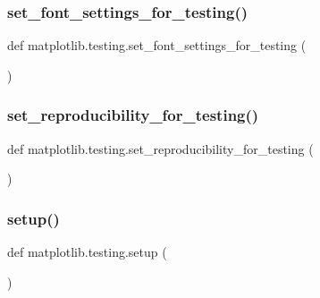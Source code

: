 \subsubsection{\texorpdfstring{set\+\_\+font\+\_\+settings\+\_\+for\+\_\+testing()}{set\_font\_settings\_for\_testing()}}
{\footnotesize\ttfamily def matplotlib.\+testing.\+set\+\_\+font\+\_\+settings\+\_\+for\+\_\+testing (\begin{DoxyParamCaption}{ }\end{DoxyParamCaption})}

\mbox{\label{namespacematplotlib_1_1testing_a52faea5be4a2f14a557b8adb5b7f3294}} 
\subsubsection{\texorpdfstring{set\+\_\+reproducibility\+\_\+for\+\_\+testing()}{set\_reproducibility\_for\_testing()}}
{\footnotesize\ttfamily def matplotlib.\+testing.\+set\+\_\+reproducibility\+\_\+for\+\_\+testing (\begin{DoxyParamCaption}{ }\end{DoxyParamCaption})}

\mbox{\label{namespacematplotlib_1_1testing_a982fab1af51b1415bd9a633d60ac92d0}} 
\subsubsection{\texorpdfstring{setup()}{setup()}}
{\footnotesize\ttfamily def matplotlib.\+testing.\+setup (\begin{DoxyParamCaption}{ }\end{DoxyParamCaption})}

